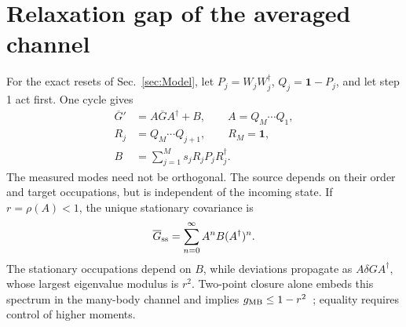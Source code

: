 \documentclass[aps,prb,10pt,twocolumn,superscriptaddress,longbibliography,floatfix]{revtex4-2}
\begin{document}
\section{Relaxation gap of the averaged channel}
\label{app:ChannelGap}
{\color{blue}
For the exact resets of Sec.~\ref{sec:Model}, let $P_j=W_jW_j^\dagger$, $Q_j=\mathbf{1}-P_j$, and let step 1 act first. One cycle gives
\begin{align}
 \overline G'&=A\overline GA^\dagger+B,\qquad A=Q_M\cdots Q_1,\nonumber\\
 R_j&=Q_M\cdots Q_{j+1},\qquad R_M=\mathbf{1},\nonumber\\
 B&=\sum_{j=1}^M s_jR_jP_jR_j^\dagger.
 \label{eq:CycleSource}
\end{align}
The measured modes need not be orthogonal. The source depends on their order and target occupations, but is independent of the incoming state. If $r=\rho(A)<1$, the unique stationary covariance is
\begin{equation}
 \overline G_{\rm ss}=\sum_{n=0}^{\infty}A^nB(A^\dagger)^n.
 \label{eq:StationaryCovariance}
\end{equation}
The stationary occupations depend on $B$, while deviations propagate as $A\delta GA^\dagger$, whose largest eigenvalue modulus is $r^2$. Two-point closure alone embeds this spectrum in the many-body channel and implies $g_{\rm MB}\leq1-r^2$~\cite{BarthelZhang2022}; equality requires control of higher moments.

}
\end{document}
